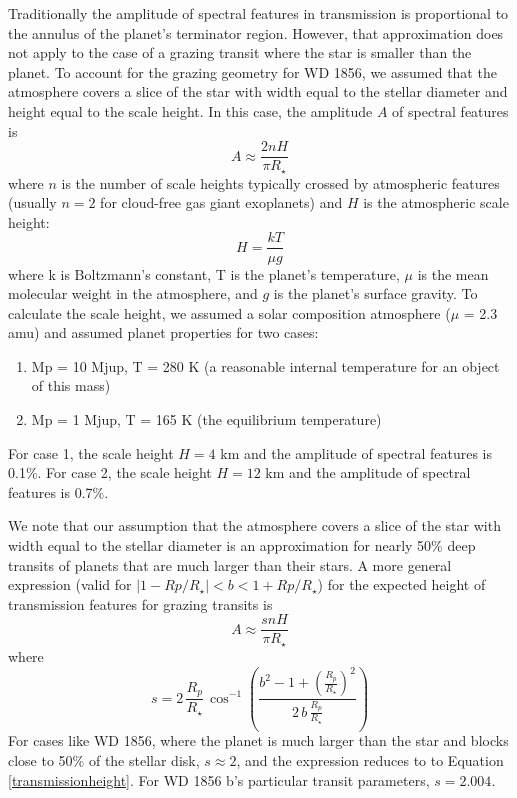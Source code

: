 \documentclass{nature3}
\newcommand*{\bedit}{\textcolor{new_black}}
\begin{document}
\begin{methods}
Traditionally the amplitude of spectral features in transmission is proportional to the annulus of the planet's terminator region\cite{kreidberg18}. However, that approximation does not apply to the case of a grazing transit where the star is smaller than the planet. To account for the grazing geometry for WD 1856, we assumed that the atmosphere covers a slice of the star with width equal to the stellar diameter and height equal to the scale height. In this case, the amplitude $A$ of spectral features is \begin{equation}\label{transmissionheight}
    A \approx \frac{2nH}{\pi R_\star}
\end{equation}
where $n$ is the number of scale heights typically crossed by atmospheric features (usually $n = 2$ for cloud-free gas giant exoplanets\cite{stevenson2016}) and $H$ is the atmospheric scale height:
\begin{equation}
    H = \frac{kT}{\mu g}
\end{equation}
where k is Boltzmann's constant, T is the planet's temperature, $\mu$ is the mean molecular weight in the atmosphere, and $g$ is the planet's surface gravity. To calculate the scale height, we assumed a solar composition atmosphere ($\mu$ = 2.3 amu) and assumed planet properties for two cases:

\begin{enumerate}
    \item Mp = 10 Mjup, T = 280 K (a reasonable internal temperature for an object of this mass)
    \item Mp = 1 Mjup, T = 165 K (the equilibrium temperature)
\end{enumerate}


For case 1, the scale height $H = 4$ km and the amplitude of spectral features is 0.1\%. For case 2, the scale height $H = 12$ km and the amplitude of spectral features is 0.7\%.

\bedit{We note that our assumption that the atmosphere covers a slice of the star with width equal to the stellar diameter is an approximation for nearly 50\% deep transits of planets that are much larger than their stars. A more general expression (valid for $\lvert 1 - Rp/R_\star \rvert < b < 1+ Rp/R_\star$) for the expected height of transmission features for grazing transits is \begin{equation}
    A \approx \frac{snH}{\pi R_\star}
\end{equation}
where
\begin{equation}
    s = 2\,\frac{R_p}{R_\star}\,\cos^{-1}\left(\frac{b^2 - 1 + \left(\frac{R_p}{R_\star}\right)^2}{2\,b\,\frac{R_p}{R_\star}}\right)
\end{equation}
For cases like WD 1856, where the planet is much larger than the star and blocks close to 50\% of the stellar disk, $s\approx2$, and the expression reduces to to Equation \ref{transmissionheight}. For WD 1856 b's particular transit parameters, $s = 2.004$. }


\end{methods}
\end{document}
